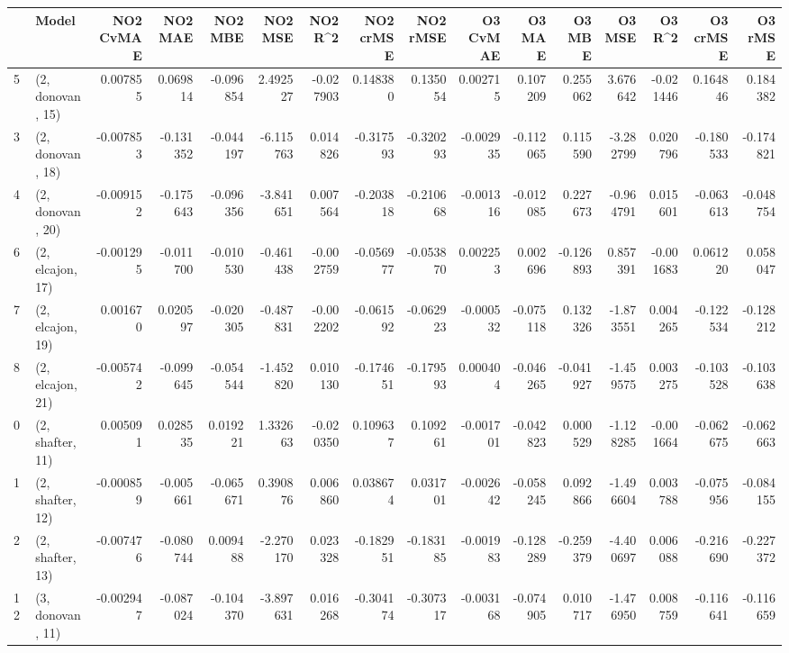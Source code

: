 \begin{tabular}{llrrrrrrrrrrrrrr}
\toprule
{} &             Model &  NO2 CvMAE &   NO2 MAE &   NO2 MBE &    NO2 MSE &   NO2 R\textasciicircum2 &  NO2 crMSE &  NO2 rMSE &  O3 CvMAE &    O3 MAE &    O3 MBE &     O3 MSE &    O3 R\textasciicircum2 &  O3 crMSE &   O3 rMSE \\
\midrule
5  &  (2, donovan, 15) &   0.007855 &  0.069814 & -0.096854 &   2.492527 & -0.027903 &   0.148380 &  0.135054 &  0.002715 &  0.107209 &  0.255062 &   3.676642 & -0.021446 &  0.164846 &  0.184382 \\
3  &  (2, donovan, 18) &  -0.007853 & -0.131352 & -0.044197 &  -6.115763 &  0.014826 &  -0.317593 & -0.320293 & -0.002935 & -0.112065 &  0.115590 &  -3.282799 &  0.020796 & -0.180533 & -0.174821 \\
4  &  (2, donovan, 20) &  -0.009152 & -0.175643 & -0.096356 &  -3.841651 &  0.007564 &  -0.203818 & -0.210668 & -0.001316 & -0.012085 &  0.227673 &  -0.964791 &  0.015601 & -0.063613 & -0.048754 \\
6  &  (2, elcajon, 17) &  -0.001295 & -0.011700 & -0.010530 &  -0.461438 & -0.002759 &  -0.056977 & -0.053870 &  0.002253 &  0.002696 & -0.126893 &   0.857391 & -0.001683 &  0.061220 &  0.058047 \\
7  &  (2, elcajon, 19) &   0.001670 &  0.020597 & -0.020305 &  -0.487831 & -0.002202 &  -0.061592 & -0.062923 & -0.000532 & -0.075118 &  0.132326 &  -1.873551 &  0.004265 & -0.122534 & -0.128212 \\
8  &  (2, elcajon, 21) &  -0.005742 & -0.099645 & -0.054544 &  -1.452820 &  0.010130 &  -0.174651 & -0.179593 &  0.000404 & -0.046265 & -0.041927 &  -1.459575 &  0.003275 & -0.103528 & -0.103638 \\
0  &  (2, shafter, 11) &   0.005091 &  0.028535 &  0.019221 &   1.332663 & -0.020350 &   0.109637 &  0.109261 & -0.001701 & -0.042823 &  0.000529 &  -1.128285 & -0.001664 & -0.062675 & -0.062663 \\
1  &  (2, shafter, 12) &  -0.000859 & -0.005661 & -0.065671 &   0.390876 &  0.006860 &   0.038674 &  0.031701 & -0.002642 & -0.058245 &  0.092866 &  -1.496604 &  0.003788 & -0.075956 & -0.084155 \\
2  &  (2, shafter, 13) &  -0.007476 & -0.080744 &  0.009488 &  -2.270170 &  0.023328 &  -0.182951 & -0.183185 & -0.001983 & -0.128289 & -0.259379 &  -4.400697 &  0.006088 & -0.216690 & -0.227372 \\
12 &  (3, donovan, 11) &  -0.002947 & -0.087024 & -0.104370 &  -3.897631 &  0.016268 &  -0.304174 & -0.307317 & -0.003168 & -0.074905 &  0.010717 &  -1.476950 &  0.008759 & -0.116641 & -0.116659 \\

\end{tabular}
